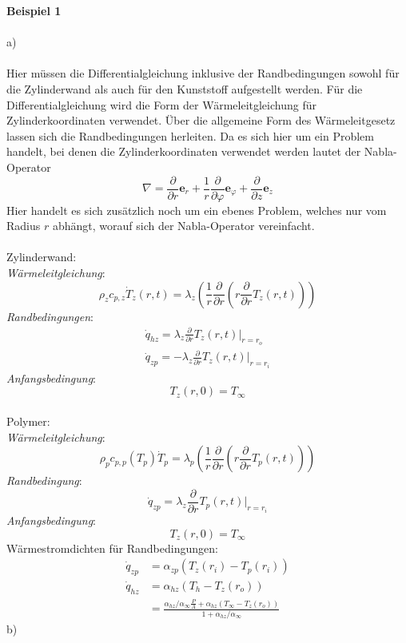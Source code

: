 \textbf{Beispiel 1} \\ \\
a)\\ \\
Hier müssen die Differentialgleichung inklusive der Randbedingungen sowohl für die Zylinderwand als auch für den Kunststoff aufgestellt werden. Für die Differentialgleichung wird die Form der Wärmeleitgleichung  für Zylinderkoordinaten verwendet. Über die allgemeine Form des Wärmeleitgesetz lassen sich die Randbedingungen herleiten. Da es sich hier um ein Problem handelt, bei denen die Zylinderkoordinaten verwendet werden lautet der Nabla-Operator
\[
	\nabla = \frac{\partial}{\partial r}\textbf{e}_r + \frac{1}{r}\frac{\partial}{\partial \varphi}\textbf{e}_{\varphi} + \frac{\partial}{\partial z}\textbf{e}_z
\]
Hier handelt es sich zusätzlich noch um ein ebenes Problem, welches nur vom Radius $r$ abhängt, worauf sich der Nabla-Operator vereinfacht.\\ \\
Zylinderwand:\\
\textit{Wärmeleitgleichung}:
\[
	\rho_z c_{p,z} \dot{T}_z(r,t) = \lambda_z \left( \frac{1}{r}\frac{\partial}{\partial r}\left( r \frac{\partial}{\partial r}T_z(r,t)\right)\right)
\]
\textit{Randbedingungen}:
\begin{align*}
	\dot{q}_{hz} = \lambda_z\frac{\partial}{\partial r}T_z(r,t)|_{r = r_o} \\
	\dot{q}_{zp} = - \lambda_z\frac{\partial}{\partial r}T_z(r,t)|_{r = r_i}
\end{align*}
\textit{Anfangsbedingung}:
\[
	T_z(r,0) = T_\infty
\]
\\
Polymer:\\
\textit{Wärmeleitgleichung}:
\[
	\rho_p c_{p,p}(T_p)\dot{T}_p =  \lambda_p \left( \frac{1}{r}\frac{\partial}{\partial r}\left( r \frac{\partial}{\partial r}T_p(r,t)\right)\right)
\]
\textit{Randbedingung}:
\[
		\dot{q}_{zp} = \lambda_z\frac{\partial}{\partial r}T_p(r,t)|_{r = r_i}
\]
\textit{Anfangsbedingung}:
\[
T_z(r,0) = T_\infty
\]
Wärmestromdichten für Randbedingungen:
\begin{align*}
	\dot{q}_{zp} &= \alpha_{zp} (T_z(r_i) - T_p(r_i)) \\
	\dot{q}_{hz} &= \alpha_{hz} (T_h - T_z(r_o)) \\
				 &= \frac{\alpha_{hz} / \alpha_\infty \frac{P}{A} + \alpha_{hz}(T_\infty - T_z(r_o))}{1 + \alpha_{hz} / \alpha_\infty}
\end{align*}
\newpage
b) \\ \\
